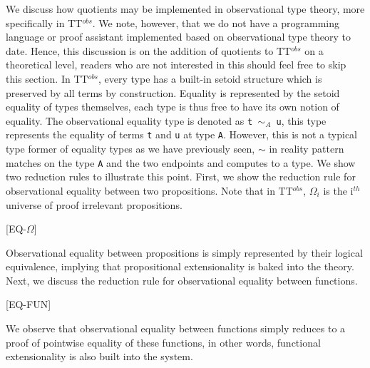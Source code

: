 \documentclass[12pt,twoside,maitrise]{dms}
\theoremstyle{definition}
\numberwithin{equation}{section}
\numberwithin{table}{chapter}
\numberwithin{figure}{chapter}
\newcommand\kw[1] {\textsf{#1}}
\newcommand\id[1] {\texttt{#1}}
\newcommand\fn[1] {\texttt{#1}}
\begin{document}
We discuss how quotients may be implemented in observational type theory, more
specifically in TT$^{obs}$\cite{pujet2022observational}. We note, however, that
we do not have a programming language or proof assistant implemented based on
observational type theory to date. Hence, this discussion is on the addition of
quotients to TT$^{obs}$ on a theoretical level, readers who are not interested
in this should feel free to skip this section. In TT$^{obs}$, every type has a
built-in setoid structure which is preserved by all terms by construction.
Equality is represented by the setoid equality of types themselves, each type is
thus free to have its own notion of equality. The observational equality type is
denoted as \fn{t $\sim_A$ u}, this type represents the equality of terms \id{t}
and \id{u} at type \id{A}. However, this is not a typical type former of
equality types as we have previously seen, $\sim$ in reality pattern matches on
the type \id{A} and the two endpoints and computes to a type. We show two
reduction rules to illustrate this point. First, we show the reduction rule for
observational equality between two propositions. Note that in TT$^{obs}$,
$\Omega_i$ is the i$^{th}$ universe of proof irrelevant propositions.

\begin{prooftree*}

  [\kw{EQ-$\Omega$}]{}
\end{prooftree*}

Observational equality between propositions is simply represented by their
logical equivalence, implying that propositional extensionality is baked into
the theory. Next, we discuss the reduction rule for observational equality
between functions.

\begin{prooftree*}

  [\kw{EQ-FUN}]{}
\end{prooftree*}

We observe that observational equality between functions simply reduces to a
proof of pointwise equality of these functions, in other words, functional
extensionality is also built into the system.
\end{document}
